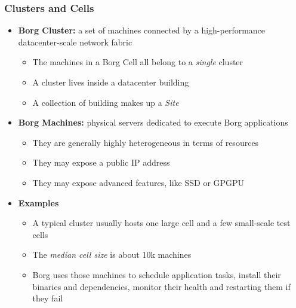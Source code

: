 \begin{frame}
\frametitle{Clusters and Cells}
\begin{itemize}
	\item {\bf Borg Cluster:} a set of machines connected by a high-performance datacenter-scale network fabric
	\begin{itemize}
		\item The machines in a Borg Cell all belong to a {\it single} cluster
		\item A cluster lives inside a datacenter building
		\item A collection of building makes up a {\it Site}
	\end{itemize}
	\item {\bf Borg Machines:} physical servers dedicated to execute Borg applications
	\begin{itemize}
		\item They are generally highly heterogeneous in terms of resources
		\item They may expose a public IP address
		\item They may expose advanced features, like SSD or GPGPU
	\end{itemize}
	\item {\bf Examples}
	\begin{itemize}
		\item A typical cluster usually hosts one large cell and a few small-scale test cells
		\item The {\it median cell size} is about 10k machines
		\item Borg uses those machines to schedule application tasks, install their binaries and dependencies, monitor their health and restarting them if they fail
	\end{itemize}
\end{itemize}
\end{frame}

